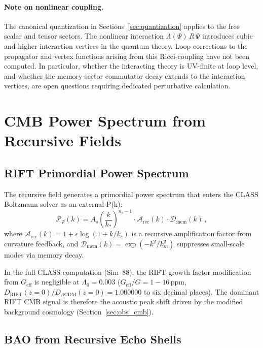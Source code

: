 \documentclass[12pt,a4paper]{article}
\begin{document}
\paragraph{Note on nonlinear coupling.}
The canonical quantization in Sections~\ref{sec:quantization} applies to the
free scalar and tensor sectors. The nonlinear interaction $\Lambda(\Psi)\,R\,\Psi$
introduces cubic and higher interaction vertices in the quantum theory.
Loop corrections to the propagator and vertex functions arising from this
Ricci-coupling have not been computed.  In particular, whether the interacting
theory is UV-finite at loop level, and whether the memory-sector commutator
decay extends to the interaction vertices, are open questions requiring
dedicated perturbative calculation.

\section{CMB Power Spectrum from Recursive Fields}
\label{sec:cmb}

\subsection{RIFT Primordial Power Spectrum}

The recursive field generates a primordial power spectrum that enters the
CLASS Boltzmann solver as an external P(k):
\begin{equation}
\mathcal{P}_\Psi(k) = A_s\left(\frac{k}{k_*}\right)^{n_s-1}
\cdot \mathcal{A}_{\mathrm{rec}}(k) \cdot \mathcal{D}_{\mathrm{mem}}(k)\,,
\end{equation}
where $\mathcal{A}_{\mathrm{rec}}(k) = 1 + \epsilon\log(1 + k/k_c)$ is a
recursive amplification factor from curvature feedback, and
$\mathcal{D}_{\mathrm{mem}}(k) = \exp(-k^2/k_m^2)$ suppresses small-scale modes
via memory decay.

In the full CLASS computation (Sim~88), the RIFT growth factor modification
from $G_{\mathrm{eff}}$ is negligible at $\Lambda_0 = 0.003$
($G_{\mathrm{eff}}/G = 1 - 16\,\mathrm{ppm}$,
$D_{\mathrm{RIFT}}(z=0)/D_{\Lambda\mathrm{CDM}}(z=0) = 1.000000$
to six decimal places). The dominant RIFT CMB signal is therefore the
acoustic peak shift driven by the modified background cosmology
(Section~\ref{sec:obs_cmb}).

\subsection{BAO from Recursive Echo Shells}
\label{sec:bao_theory}
\end{document}
